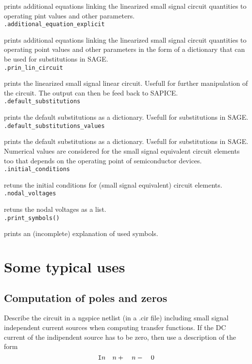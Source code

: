 \documentclass[a4paper]{article}
\begin{document}
prints additional equations linking the linearized small signal circuit quantities to operating pint values and other parameters.\\

{\tt .additional\_equation\_explicit}

prints additional equations linking the linearized small signal circuit quantities to operating point values and other parameters in the form of a dictionary that can be used for substitutions in SAGE.\\

{\tt .prin\_lin\_circuit}

prints the linearized small signal linear circuit. Usefull for further manipulation of the circuit. The output can then be feed back to SAPICE.\\

{\tt .default\_substitutions}

prints the default substitutions as a dictionary. Usefull for substitutions in SAGE.\\

{\tt .default\_substitutions\_values}

prints the default substitutions as a dictionary. Usefull for substitutions in SAGE. Numerical values are considered for the small signal equivalent circuit elements too that depends on the operating point of semiconductor devices.\\

{\tt .initial\_conditions}

retuns the initial conditions for (small signal equivalent) circuit elements.\\

{\tt .nodal\_voltages}

retuns the nodal voltages as a list.\\

{\tt .print\_symbols()}

prints an (incomplete) explanation of used symbols.

\section{Some typical uses}
\subsection{Computation of poles and zeros}

Describe the circuit in a ngspice netlist (in a .cir file) including small signal independent current sources when computing transfer functions. If the DC current of the indipendent source has to be zero, then use a description of the form
\begin{displaymath}
{\tt I}n\quad n+\quad n-\quad 0
\end{displaymath}
\end{document}
